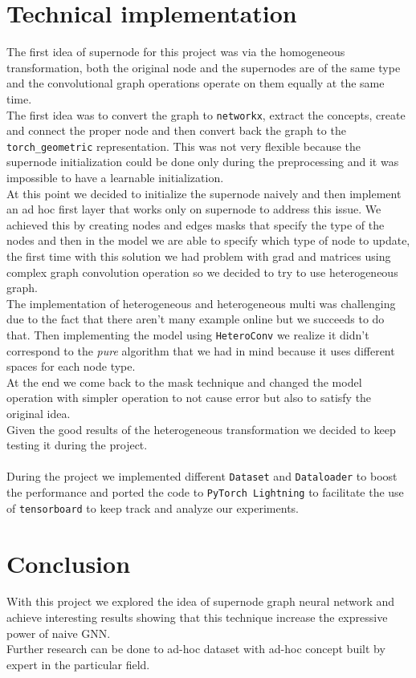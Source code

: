 \documentclass[twoside,11pt]{article}
\begin{document}

\section{Technical implementation}
The first idea of supernode for this project was via the homogeneous transformation, both the original node and the supernodes are of the same type and the convolutional graph operations operate on them equally at the same time.\\ The first idea was to convert the graph to \texttt{networkx}, extract the concepts, create and connect the proper node and then convert back the graph to the \texttt{torch\_geometric} representation. This was not very flexible because the supernode initialization could be done only during the preprocessing and it was impossible to have a learnable initialization.\\
At this point we decided to initialize the supernode naively and then implement an ad hoc first layer that works only on supernode to address this issue. We achieved this by creating nodes and edges masks that specify the type of the nodes and then in the model we are able to specify which type of node to update, the first time with this solution we had problem with grad and matrices using complex graph convolution operation so we decided to try to use heterogeneous graph.\\
The implementation of heterogeneous and heterogeneous multi was challenging due to the fact that there aren't many example online but we succeeds to do that.
Then implementing the model using \texttt{HeteroConv} we realize it didn't correspond to the \textit{pure} algorithm that we had in mind because it uses different spaces for each node type.\\
At the end we come back to the mask technique and changed the model operation with simpler operation to not cause error but also to satisfy the original idea.\\
Given the good results of the heterogeneous transformation we decided to keep testing it during the project.\\\\
During the project we implemented different \texttt{Dataset} and \texttt{Dataloader} to boost the performance and ported the code to \texttt{PyTorch Lightning} to facilitate the use of \texttt{tensorboard} to keep track and analyze our experiments.

\section{Conclusion}
With this project we explored the idea of supernode graph neural network and achieve interesting results showing that this technique increase the expressive power of naive GNN.\\
Further research can be done to ad-hoc dataset with ad-hoc concept built by expert in the particular field.
\end{document}
